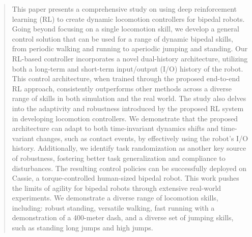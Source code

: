 \begin{abstract}
This paper presents a comprehensive study on using deep reinforcement learning (RL) to create dynamic locomotion controllers for bipedal robots. 
Going beyond focusing on a single locomotion skill, we develop a general control solution that can be used for a range of dynamic bipedal skills, from periodic walking and running to aperiodic jumping and standing.
Our RL-based controller incorporates a novel dual-history architecture, utilizing both a long-term and short-term input/output (I/O) history of the robot. 
This control architecture, when trained through the proposed end-to-end RL approach, consistently outperforms other methods across a diverse range of skills in both simulation and the real world.
The study also delves into the adaptivity and robustness introduced by the proposed RL system in developing locomotion controllers. 
We demonstrate that the proposed architecture can adapt to both time-invariant dynamics shifts and time-variant changes, such as contact events, by effectively using the robot's I/O history. 
Additionally, we identify task randomization as another key source of robustness, fostering better task generalization and compliance to disturbances.
The resulting control policies can be successfully deployed on Cassie, a torque-controlled human-sized bipedal robot.
This work pushes the limits of agility for bipedal robots through extensive real-world experiments. We demonstrate a diverse range of locomotion skills, including: robust standing, versatile walking, fast running with a demonstration of a 400-meter dash, and a diverse set of jumping skills, such as standing long jumps and high jumps.
\end{abstract}